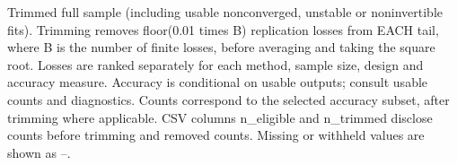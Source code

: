 \begin{table}[p]\centering
\caption{Usable IRF replications.}
\label{tab:sim-irf-counts}
\small\setlength{\tabcolsep}{4pt}\renewcommand{\arraystretch}{1.15}
\par\medskip
\begin{minipage}{\linewidth}\footnotesize Trimmed full sample (including usable nonconverged, unstable or noninvertible fits). Trimming removes floor(0.01 times B) replication losses from EACH tail, where B is the number of finite losses, before averaging and taking the square root. Losses are ranked separately for each method, sample size, design and accuracy measure. Accuracy is conditional on usable outputs; consult usable counts and diagnostics. Counts correspond to the selected accuracy subset, after trimming where applicable. CSV columns n\_eligible and n\_trimmed disclose counts before trimming and removed counts. Missing or withheld values are shown as --.\end{minipage}
\end{table}

